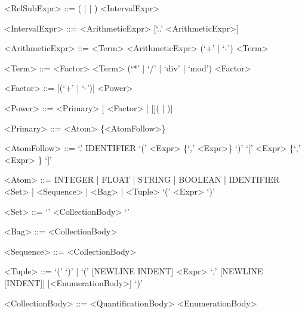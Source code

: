 \documentclass{article}
\begin{document}
\begin{grammar}
<RelSubExpr> ::= (\lit{$\setminus$} | \lit{$\ranres$} | \lit{$\ransub$}) <IntervalExpr>

<IntervalExpr> ::= <ArithmeticExpr> [`..' <ArithmeticExpr>]

<ArithmeticExpr> ::= <Term>
    \alt <ArithmeticExpr> (`+' | `-') <Term>

<Term> ::= <Factor>
    \alt <Term> (`*' | `/' | `div' | `mod') <Factor>

<Factor> ::= [(`+' | `-')] <Power>

<Power> ::= <Primary> [\lit{\^{}} <Factor> | [\lit{${}^-$}]( | )]

<Primary> ::= <Atom> \{<AtomFollow>\}

<AtomFollow> ::= `.' IDENTIFIER
    \alt `(' <Expr> \{`,' <Expr>\} `)'
    \alt `[' <Expr> \{`,' <Expr> \} `]' %

<Atom> ::= INTEGER | FLOAT | STRING | BOOLEAN | IDENTIFIER
    \alt <Set> | <Sequence> | <Bag> | <Tuple>
    \alt `(' <Expr> `)' %

<Set> ::= `{' <CollectionBody> `}'

<Bag> ::= \lit{$\llbracket$} <CollectionBody> \lit{$\rrbracket$}

<Sequence> ::= \lit{$\langle$} <CollectionBody> \lit{$\rangle$}

<Tuple> ::= `(' `)' | `(' [NEWLINE INDENT] <Expr> `,' [NEWLINE [INDENT]] [<EnumerationBody>] `)'

<CollectionBody> ::= <QuantificationBody>
    \alt <EnumerationBody>


\end{grammar}
\end{document}
